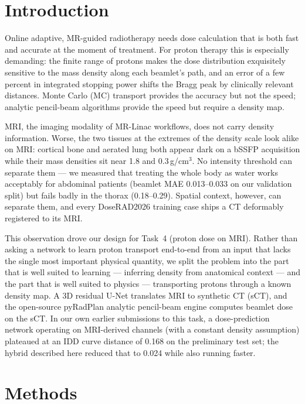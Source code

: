 \documentclass[runningheads]{llncs}
\begin{document}
\section{Introduction}
Online adaptive, MR-guided radiotherapy needs dose calculation that is both fast and accurate at the moment of treatment. For proton therapy this is especially demanding: the finite range of protons makes the dose distribution exquisitely sensitive to the mass density along each beamlet's path, and an error of a few percent in integrated stopping power shifts the Bragg peak by clinically relevant distances. Monte Carlo (MC) transport provides the accuracy but not the speed; analytic pencil-beam algorithms provide the speed but require a density map.

MRI, the imaging modality of MR-Linac workflows, does not carry density information. Worse, the two tissues at the extremes of the density scale look alike on MRI: cortical bone and aerated lung both appear dark on a bSSFP acquisition while their mass densities sit near 1.8 and 0.3\,g/cm$^3$. No intensity threshold can separate them --- we measured that treating the whole body as water works acceptably for abdominal patients (beamlet MAE 0.013--0.033 on our validation split) but fails badly in the thorax (0.18--0.29). Spatial context, however, can separate them, and every DoseRAD2026 training case ships a CT deformably registered to its MRI.

This observation drove our design for Task~4 (proton dose on MRI). Rather than asking a network to learn proton transport end-to-end from an input that lacks the single most important physical quantity, we split the problem into the part that is well suited to learning --- inferring density from anatomical context --- and the part that is well suited to physics --- transporting protons through a known density map. A 3D residual U-Net translates MRI to synthetic CT (sCT), and the open-source pyRadPlan analytic pencil-beam engine \cite{pyradplan,matrad} computes beamlet dose on the sCT. In our own earlier submissions to this task, a dose-prediction network operating on MRI-derived channels (with a constant density assumption) plateaued at an IDD curve distance of 0.168 on the preliminary test set; the hybrid described here reduced that to 0.024 while also running faster.

\section{Methods}
\end{document}
